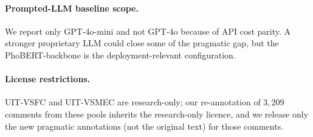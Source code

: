 \paragraph{Prompted-LLM baseline scope.}
We report only GPT-4o-mini and not GPT-4o because of API cost
parity. A stronger proprietary LLM could close some of the pragmatic
gap, but the PhoBERT-backbone \method{} is the deployment-relevant
configuration.

\paragraph{License restrictions.}
UIT-VSFC and UIT-VSMEC are research-only; our re-annotation of
$3{,}209$ comments from these pools inherits the research-only
licence, and we release only the new pragmatic annotations (not the
original text) for those comments.
